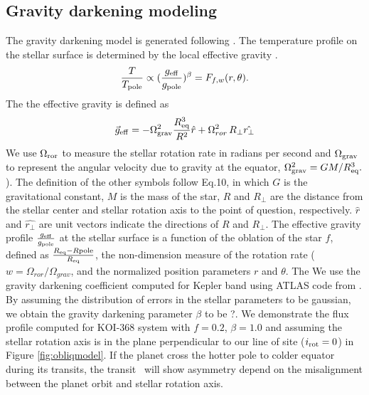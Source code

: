 \documentclass[preprint]{emulateapj}
\begin{document}

\subsection{Gravity darkening modeling}
\label{sec:grav-model}
The gravity darkening model is generated following \citet{Barnes:2009}.
The temperature profile on the stellar surface is determined by the local 
effective gravity \citep{Zeipel:1924}. 
\begin{equation}
\frac{T}{T_{\rm pole}} \propto (\frac{g_{\rm eff}}{g_{\rm pole}})^{\beta} 
= F_{f,w} (r,\theta).
\end{equation}
The the effective gravity is defined as 
\begin{equation}
\vec{g}_{\rm eff} = -\Omega_{\rm grav}^2\frac{R_{\rm eq}^3}{R^2}\hat{r} \\ 
+ \Omega_{ror}^2\,R_{\perp}\hat{r_{\perp}}
\end{equation}
We use $\Omega_{\rm ror}$ to measure the stellar rotation rate in radians 
per second and $\Omega_{\rm grav}$ to represent the angular velocity due to 
gravity at the equator, $\Omega_{\rm grav}^2 = GM/R_{\rm eq}^3.$). 
The definition of the other symbols follow \citet{Barnes:2009} Eq.10, in 
which $G$ is the gravitational constant, $M$ is the mass of the star, $R$ 
and $R_{\perp}$ are the distance from the stellar center and stellar 
rotation axis to the point of question, respectively. $\hat{r}$ and 
$\hat{r_{\perp}}$ are unit vectors indicate the directions of $R$ and 
$R_{\perp}$. 
The effective gravity profile $\frac{g_{\rm eff}}{g_{\rm pole}}$ at the stellar 
surface is a function of the oblation of the star $f$, defined as 
$\frac{R_{\rm eq}-R{\rm pole}}{R_{\rm eq}}$, the non-dimension 
measure of the rotation rate ($w=\Omega_{ror}/\Omega_{grav}$, 
and the normalized position parameters $r$ and $\theta$. The 
We use the gravity darkening coefficient computed 
for Kepler band using ATLAS code from \citet{Claret:2011}. By assuming the 
distribution of errors in the stellar parameters to be gaussian, we obtain 
the gravity darkening parameter $\beta$ to be ?.
We demonstrate the flux profile computed for KOI-368 system with $f=0.2$, 
$\beta=1.0$ and assuming the stellar rotation axis is in the plane 
perpendicular to our line of site ($i_{\rm rot}=0$) in Figure 
\ref{fig:obliqmodel}. If the planet cross the hotter pole to colder 
equator during its transits, the transit \lcs\ will show asymmetry depend 
on the misalignment between the planet orbit and stellar rotation axis.
\end{document}
